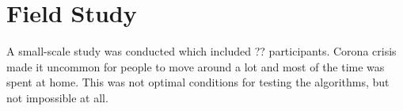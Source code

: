 \section{Field Study}
A small-scale study was conducted which included ?? participants. Corona crisis made it uncommon for people to move around a lot and most of the time was spent at home. This was not optimal conditions for testing the algorithms, but not impossible at all.